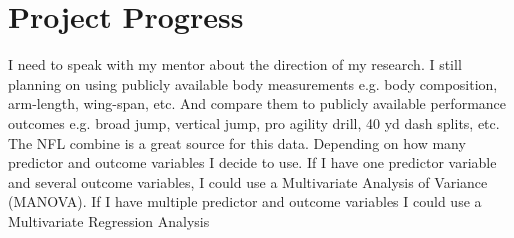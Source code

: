\documentclass{article}
\begin{document}
\section{Project Progress}

I need to speak with my mentor about the direction of my research.  I still planning on using publicly available body measurements e.g. body composition, arm-length, wing-span, etc.  And compare them to publicly available performance outcomes e.g. broad jump, vertical jump, pro agility drill, 40 yd dash splits, etc.  The NFL combine is a great source for this data.  Depending on how many predictor and outcome variables I decide to use.  If I have one predictor variable and several outcome variables, I could use a Multivariate Analysis of Variance (MANOVA). If I have multiple predictor and outcome variables I could use a Multivariate Regression Analysis 
\end{document}
